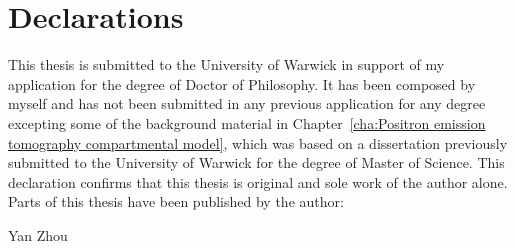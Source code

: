 \chapter*{Declarations}

This thesis is submitted to the University of Warwick in support of my
application for the degree of Doctor of Philosophy. It has been composed by
myself and has not been submitted in any previous application for any degree
excepting some of the background material in Chapter~\ref{cha:Positron
emission tomography compartmental model}, which was based on a dissertation
previously submitted to the University of Warwick for the degree of Master of
Science. This declaration confirms that this thesis is original and sole work
of the author alone. Parts of this thesis have been published by the author:





\baselineskip
\noindent Yan Zhou
